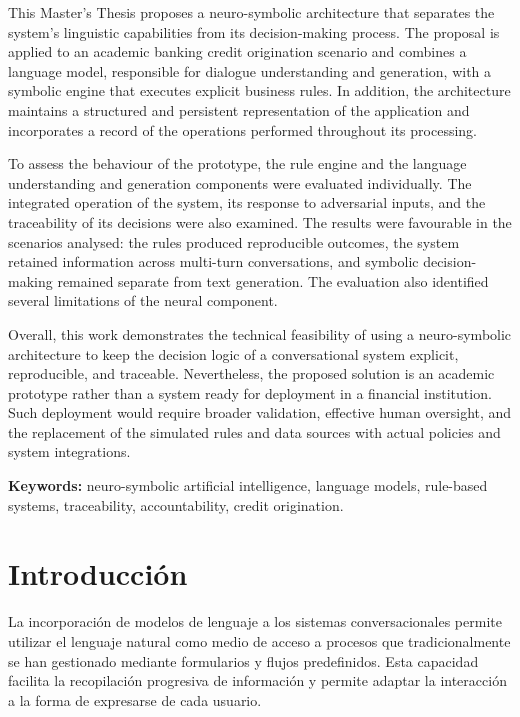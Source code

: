 \documentclass[12pt,a4paper]{report}
\begin{document}
This Master's Thesis proposes a neuro-symbolic architecture that separates the system's linguistic capabilities from its decision-making process. The proposal is applied to an academic banking credit origination scenario and combines a language model, responsible for dialogue understanding and generation, with a symbolic engine that executes explicit business rules. In addition, the architecture maintains a structured and persistent representation of the application and incorporates a record of the operations performed throughout its processing.

To assess the behaviour of the prototype, the rule engine and the language understanding and generation components were evaluated individually. The integrated operation of the system, its response to adversarial inputs, and the traceability of its decisions were also examined. The results were favourable in the scenarios analysed: the rules produced reproducible outcomes, the system retained information across multi-turn conversations, and symbolic decision-making remained separate from text generation. The evaluation also identified several limitations of the neural component.

Overall, this work demonstrates the technical feasibility of using a neuro-symbolic architecture to keep the decision logic of a conversational system explicit, reproducible, and traceable. Nevertheless, the proposed solution is an academic prototype rather than a system ready for deployment in a financial institution. Such deployment would require broader validation, effective human oversight, and the replacement of the simulated rules and data sources with actual policies and system integrations. 

\vspace{0.5cm}

\noindent\textbf{Keywords:} neuro-symbolic artificial intelligence, language models, rule-based systems, traceability, accountability, credit origination.

\newpage

\tableofcontents
\newpage
{}

\chapter{Introducción}

La incorporación de modelos de lenguaje a los sistemas conversacionales permite utilizar el lenguaje natural como medio de acceso a procesos que tradicionalmente se han gestionado mediante formularios y flujos predefinidos. Esta capacidad facilita la recopilación progresiva de información y permite adaptar la interacción a la forma de expresarse de cada usuario.
\end{document}

